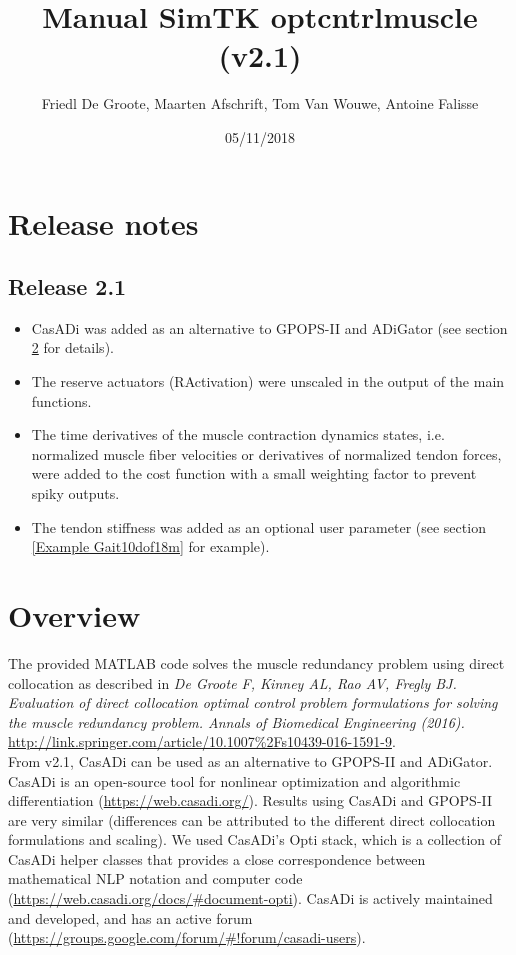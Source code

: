 \documentclass[a4paper,oneside,11pt]{article}
\begin{document}
\title{Manual SimTK optcntrlmuscle (v2.1)}
\author{Friedl De Groote, Maarten Afschrift, Tom Van Wouwe, Antoine Falisse}
\date{05/11/2018} 
\maketitle
\tableofcontents

\section{Release notes}

\subsection{Release 2.1}
\begin{itemize}
	\item CasADi was added as an alternative to GPOPS-II and ADiGator (see section \ref{Overview} for details).
	\item The reserve actuators (RActivation) were unscaled in the output of the main functions.
	\item The time derivatives of the muscle contraction dynamics states, i.e. normalized muscle fiber velocities or derivatives of normalized tendon forces, were added to the cost function with a small weighting factor to prevent spiky outputs.
	 \item The tendon stiffness was added as an optional user parameter (see section \ref{Example Gait10dof18m} for example).
\end{itemize}


\section{Overview}
\label{Overview}

The provided MATLAB code solves the muscle redundancy problem using direct collocation  as described in \textit{De Groote F, Kinney AL, Rao AV, Fregly BJ. Evaluation of direct collocation optimal control problem formulations for solving the muscle redundancy problem. Annals of Biomedical Engineering (2016).} \url{http://link.springer.com/article/10.1007%2Fs10439-016-1591-9}. 
\\

From v2.1, CasADi can be used as an alternative to GPOPS-II and ADiGator. CasADi is an open-source tool for nonlinear optimization and algorithmic differentiation (\url{https://web.casadi.org/}). Results using CasADi and GPOPS-II are very similar (differences can be attributed to the different direct collocation formulations and scaling). We used CasADi's Opti stack, which is a collection of CasADi helper classes that provides a close correspondence between mathematical NLP notation and computer code (\url{https://web.casadi.org/docs/#document-opti}). CasADi is actively maintained and developed, and  has an active forum (\url{https://groups.google.com/forum/#!forum/casadi-users}). \\
\end{document}
